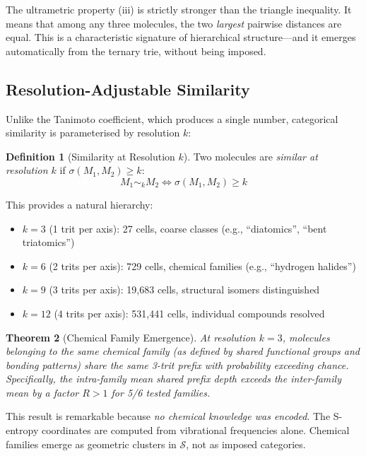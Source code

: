 \documentclass[11pt,twocolumn,a4paper]{article}
\newtheorem{theorem}{Theorem}[section]
\theoremstyle{definition}
\newtheorem{definition}[theorem]{Definition}
\theoremstyle{remark}
\newcommand{\Sspace}{\mathcal{S}}
\begin{document}
The ultrametric property (iii) is strictly stronger than the triangle inequality. It means that among any three molecules, the two \emph{largest} pairwise distances are equal. This is a characteristic signature of hierarchical structure---and it emerges automatically from the ternary trie, without being imposed.

\subsection{Resolution-Adjustable Similarity}

Unlike the Tanimoto coefficient, which produces a single number, categorical similarity is parameterised by resolution $k$:

\begin{definition}[Similarity at Resolution $k$]
\label{def:sim_k}
Two molecules are \emph{similar at resolution $k$} if $\sigma(M_1, M_2) \geq k$:
\begin{equation}
M_1 \sim_k M_2 \iff \sigma(M_1, M_2) \geq k
\label{eq:sim_k}
\end{equation}
\end{definition}

This provides a natural hierarchy:
\begin{itemize}[nosep]
\item $k = 3$ (1 trit per axis): 27 cells, coarse classes (e.g., ``diatomics'', ``bent triatomics'')
\item $k = 6$ (2 trits per axis): 729 cells, chemical families (e.g., ``hydrogen halides'')
\item $k = 9$ (3 trits per axis): 19{,}683 cells, structural isomers distinguished
\item $k = 12$ (4 trits per axis): 531{,}441 cells, individual compounds resolved
\end{itemize}

\begin{theorem}[Chemical Family Emergence]
\label{thm:family_emergence}
At resolution $k = 3$, molecules belonging to the same chemical family (as defined by shared functional groups and bonding patterns) share the same 3-trit prefix with probability exceeding chance. Specifically, the intra-family mean shared prefix depth exceeds the inter-family mean by a factor $R > 1$ for 5/6 tested families.
\end{theorem}

This result is remarkable because \emph{no chemical knowledge was encoded}. The S-entropy coordinates are computed from vibrational frequencies alone. Chemical families emerge as geometric clusters in $\Sspace$, not as imposed categories.
\end{document}
